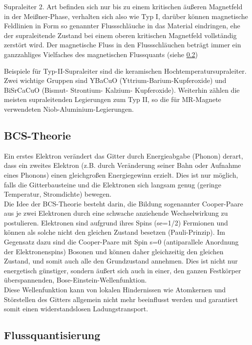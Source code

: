 \documentclass[12pt]{article}
\begin{document}
Supraleiter 2. Art befinden sich nur bis zu einem kritischen äußeren Magnetfeld in der Meißner-Phase, verhalten sich also wie Typ I, darüber können magnetische Feldlinien in Form so genannter Flussschläuche in das Material eindringen, ehe der supraleitende Zustand bei einem oberen kritischen Magnetfeld vollständig zerstört wird. Der magnetische Fluss in den Flussschläuchen beträgt immer ein ganzzahliges Vielfaches des magnetischen Flussquants (siehe \ref{flussquantisierung})

Beispiele für Typ-II-Supraleiter sind die keramischen Hochtemperatursupraleiter. Zwei wichtige Gruppen sind YBaCuO (Yttrium-Barium-Kupferoxide) und BiSrCaCuO (Bismut- Strontium- Kalzium- Kupferoxide). Weiterhin zählen die meisten supraleitenden Legierungen zum Typ II, so die für MR-Magnete verwendeten Niob-Aluminium-Legierungen.

\subsection{BCS-Theorie}
\label{bcs}
Ein erstes Elektron verändert das Gitter durch Energieabgabe (Phonon) derart, dass ein zweites Elektron (z.B. durch Veränderung seiner Bahn oder Aufnahme eines Phonons) einen gleichgroßen Energiegewinn erzielt. Dies ist nur möglich, falls die Gitterbausteine und die Elektronen sich langsam genug (geringe  Temperatur, Stromdichte) bewegen.\\

Die Idee der BCS-Theorie besteht darin, die Bildung sogenannter Cooper-Paare aus je zwei Elektronen durch eine schwache anziehende Wechselwirkung zu postulieren. Elektronen sind aufgrund ihres Spins (se=1/2) Fermionen und können als solche nicht den gleichen Zustand besetzen (Pauli-Prinzip). Im Gegensatz dazu sind die Cooper-Paare mit Spin s=0 (antiparallele Anordnung der Elektronenspins) Bosonen und können daher gleichzeitig den gleichen Zustand, und somit auch alle den Grundzustand annehmen. Dies ist nicht nur energetisch günstiger, sondern äußert sich auch in einer, den ganzen Festkörper überspannenden, Bose-Einstein-Wellenfunktion.\\

Diese Wellenfunktion kann von lokalen Hindernissen wie Atomkernen und Störstellen des Gitters allgemein nicht mehr beeinflusst werden und garantiert somit einen widerstandslosen Ladungstransport.

\subsection{Flussquantisierung}
\label{flussquantisierung}
\end{document}
